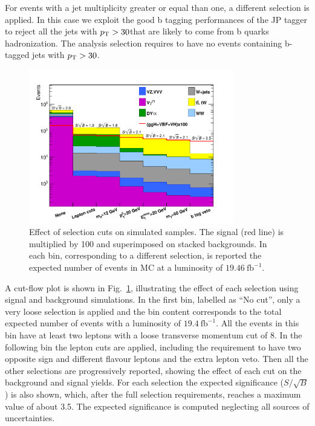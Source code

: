 For events with a jet multiplicity greater or equal than one, a different selection is applied. In this case we exploit the good b tagging performances of the JP tagger to reject all the jets with $p_\mathrm{T} > 30$\GeV that are likely to come from b quarks hadronization. The analysis selection requires to have no events containing b-tagged jets with $p_\mathrm{T} > 30$\GeV.

\begin{figure}[htb]
\centering
\includegraphics[width=0.8\textwidth]{images/cutflow-thesis.pdf}
\caption{Effect of selection cuts on simulated samples. The signal (red line) is multiplied by 100 and superimposed on stacked backgrounds. In each bin, corresponding to a different selection, is reported the expected number of events in MC at a luminosity of $19.46~\mathrm{fb}^{-1}$.}\label{fig:cutflow}
\end{figure}

A cut-flow plot is shown in Fig.~\ref{fig:cutflow}, illustrating the effect of each selection using signal and background simulations. In the first bin, labelled as ``No cut'', only a very loose selection is applied and the bin content corresponds to the total expected number of events with a luminosity of $19.4~\mathrm{fb}^{-1}$. All the events in this bin have at least two leptons with a loose transverse momentum cut of 8\GeV. In the following bin the lepton cuts are applied, including the requirement to have two opposite sign and different flavour leptons and the extra lepton veto. Then all the other selections are progressively reported, showing the effect of each cut on the background and signal yields. For each selection the expected significance ($S/\sqrt{B}$) is also shown, which, after the full selection requirements, reaches a maximum value of about 3.5. The expected significance is computed neglecting all sources of uncertainties.


